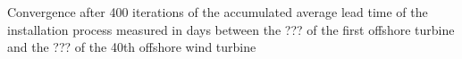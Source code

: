 \label{fig:convergence}
Convergence after 400 iterations of the accumulated average lead time of the installation process measured in days between the ??? of the first offshore turbine and the ??? of the 40th offshore wind turbine 